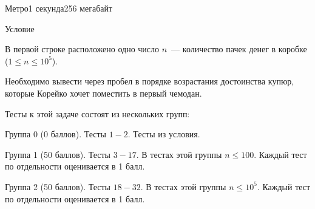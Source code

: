 \begin{problem}{Метро}{}{}{1 секунда}{256 мегабайт}

Условие

\InputFile
В первой строке расположено одно число $n$~--- количество пачек денег в коробке ($1 \le n \le 10^5$).

\OutputFile
Необходимо вывести через пробел в порядке возрастания достоинства купюр, которые Корейко хочет поместить в первый чемодан.

\Examples
\begin{example}%
%
\end{example}

\Scoring
Тесты к этой задаче состоят из нескольких групп:

\begin{shortitems}
\item Группа 0 (0 баллов). Тесты $1-2$. Тесты из условия.
\item Группа 1 (50 баллов). Тесты $3-17$. В тестах этой группы $n \le 100$. Каждый тест по отдельности оценивается в 1 балл.
\item Группа 2 (50 баллов). Тесты $18-32$. В тестах этой группы $n \le 10^5$. Каждый тест по отдельности оценивается в 1 балл.
\end{shortitems}
\end{problem}


